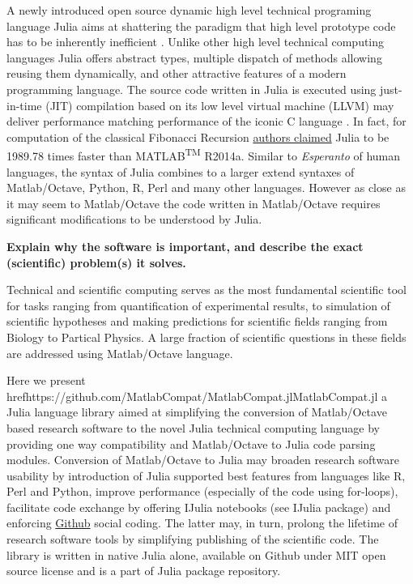 A newly introduced open source dynamic high level technical programing language Julia aims at shattering the paradigm that high level prototype code has to be inherently inefficient \cite{bezanson2012julia, bezanson2014julia}.  Unlike other high level technical computing languages Julia offers abstract types, multiple dispatch of methods allowing reusing them dynamically, and other attractive features of a modern programming language. The source code written in Julia is executed using just-in-time (JIT) compilation based on its low level virtual machine (LLVM) may deliver performance matching performance of the iconic C language \cite{bezanson2012julia, bezanson2014julia}. In fact, for computation of the classical Fibonacci Recursion \href{http://julialang.org/benchmarks/}{authors claimed} Julia to be 1989.78 times faster than MATLAB\textsuperscript{TM} R2014a. Similar to \textit{Esperanto} of human languages, the syntax of Julia combines to a larger extend syntaxes of Matlab/Octave, Python, R, Perl and many other languages. However as close as it may seem to Matlab/Octave the code written in Matlab/Octave requires significant modifications to be understood by Julia.

\textbf{Explain why the software is important, and describe the exact (scientific) problem(s) it solves.}

Technical and scientific computing serves as the most fundamental scientific tool for tasks ranging from quantification of experimental results, to simulation of scientific hypotheses and making predictions for scientific fields ranging from Biology to Partical Physics. A large fraction of scientific questions in these fields are addressed using Matlab/Octave language.

Here we present href{https://github.com/MatlabCompat/MatlabCompat.jl}{MatlabCompat.jl} a Julia language library aimed at simplifying the conversion of Matlab/Octave based research software to the novel Julia technical computing language by providing one way compatibility and Matlab/Octave to Julia code parsing modules. Conversion of Matlab/Octave to Julia may broaden research software usability by introduction of Julia supported best features from languages like R, Perl and Python, improve performance (especially of the code using for-loops), facilitate code exchange by offering IJulia notebooks (see IJulia package) and enforcing \href{http://github.com}{Github} social coding. The latter may, in turn, prolong the lifetime of research software tools by simplifying publishing of the scientific code. The library is written in native Julia alone, available on Github under MIT open source license and is a part of Julia package repository.

